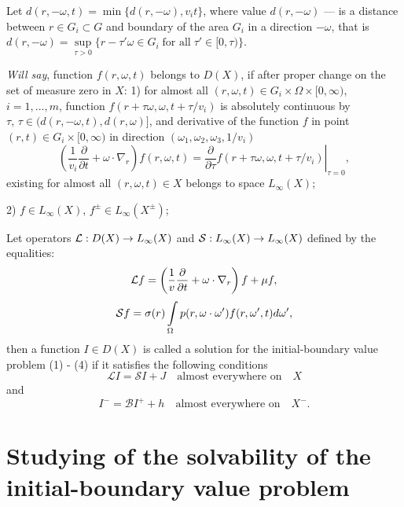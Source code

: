 \documentclass[12pt,reqno]{report}
\begin{document}
Let $d(r,-\omega,t)=\min\{d(r,-\omega), v_i t \}$, where value $d(r,-\omega)$ --- is a distance between $r \in G_i \subset G$ and boundary of the area $G_i$ in a direction $-\omega$, that is
$d(r,-\omega) = \sup \limits_{\tau
	> 0} \{ r- \tau' \omega \in G_i \; \text{for all} \; \tau' \in [0,\tau) \}$.

{\it Will say}, function $f(r,\omega,t)$ belongs to
$D(X)$, if after proper change on the set of measure zero in $X$:
1) for almost all $(r,\omega,t) \in G_i \times \Omega
\times [0,\infty)$, $i=1,...,m$, function $f(r+\tau\omega,\omega,t+\tau/v_i)$
 is absolutely continuous by $\tau,\,\tau \in
(d(r,-\omega,t), d(r,\omega)]$, and derivative of the function $f$ in point $(r,t)\in G_i \times [0,\infty)$ in direction $(\omega_1,\omega_2,\omega_3,1/v_i)$
$$ 
\left (\frac{1}{v_i} \frac{\partial }{\partial t } + \omega
\cdot \nabla_r \right) f(r,\omega,t)= \left.
\frac{\partial}{\partial \tau}
f\left(r+\tau\omega,\omega,t+\tau/v_i\right) \right |_{\tau=0},
$$
existing for almost all $(r,\omega,t) \in X$ belongs to space $L_{\infty}
(X)$;

2) $f \in L_{\infty} (X)$, $f^{\pm}\in L_{\infty} (X^{\pm})$;



Let operators ${\cal L}: D(X) \to L_{\infty}(X)$ and ${\cal S}:
L_{\infty}(X) \to L_{\infty}(X)$ defined by the equalities:
\begin{equation}
{\cal L} f = \left (\frac{1}{v} \frac{\partial }{\partial t } +
\omega \cdot \nabla_r \right) f + \mu f,
\end{equation}
\begin{equation}
{\cal S}f= \sigma(r)
\int\limits_{\Omega} p(r,\omega \cdot
\omega')f(r,\omega',t)d\omega',
\end{equation}
then a function $I \in D(X)$ is called {a solution for the initial-boundary value problem (1) - (4)}
if it satisfies the following conditions
\begin{equation}
{\mathcal L} I = {\mathcal S}I + J \quad \text{almost everywhere on} \quad X
\end{equation}
and
\begin{equation}
I^-= {\mathcal B}I^+ + h \quad \text{almost everywhere on} \quad X^-.
\end{equation}



\section{Studying of the solvability of the initial-boundary value problem}
\end{document}
